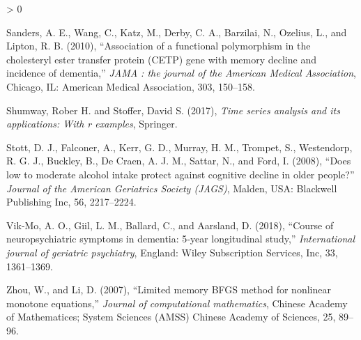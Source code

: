 \documentclass[
]{article}
\newlength{\cslhangindent}
\newenvironment{CSLReferences}[2] %
 {%
  \setlength{\parindent}{0pt}
  \ifodd #1 \everypar{\setlength{\hangindent}{\cslhangindent}}\ignorespaces\fi
  \ifnum #2 > 0
  \setlength{\parskip}{#2\baselineskip}
  \fi
 }%
 {}
\begin{document}
\begin{CSLReferences}{1}{0}
\leavevmode\hypertarget{ref-lmem4}{}%
Sanders, A. E., Wang, C., Katz, M., Derby, C. A., Barzilai, N., Ozelius, L., and Lipton, R. B. (2010), {``Association of a functional polymorphism in the cholesteryl ester transfer protein (CETP) gene with memory decline and incidence of dementia,''} \emph{JAMA : the journal of the American Medical Association}, Chicago, IL: American Medical Association, 303, 150--158.

\leavevmode\hypertarget{ref-shumway_stoffer_2017}{}%
Shumway, Rober H. and Stoffer, David S. (2017), \emph{Time series analysis and its applications: With r examples}, Springer.

\leavevmode\hypertarget{ref-lmem3}{}%
Stott, D. J., Falconer, A., Kerr, G. D., Murray, H. M., Trompet, S., Westendorp, R. G. J., Buckley, B., De Craen, A. J. M., Sattar, N., and Ford, I. (2008), {``Does low to moderate alcohol intake protect against cognitive decline in older people?''} \emph{Journal of the American Geriatrics Society (JAGS)}, Malden, USA: Blackwell Publishing Inc, 56, 2217--2224.

\leavevmode\hypertarget{ref-neuroCourse}{}%
Vik‐Mo, A. O., Giil, L. M., Ballard, C., and Aarsland, D. (2018), {``Course of neuropsychiatric symptoms in dementia: 5‐year longitudinal study,''} \emph{International journal of geriatric psychiatry}, England: Wiley Subscription Services, Inc, 33, 1361--1369.

\leavevmode\hypertarget{ref-limBFGS}{}%
Zhou, W., and Li, D. (2007), {``Limited memory BFGS method for nonlinear monotone equations,''} \emph{Journal of computational mathematics}, Chinese Academy of Mathematices; System Sciences (AMSS) Chinese Academy of Sciences, 25, 89--96.

\end{CSLReferences}
\end{document}
